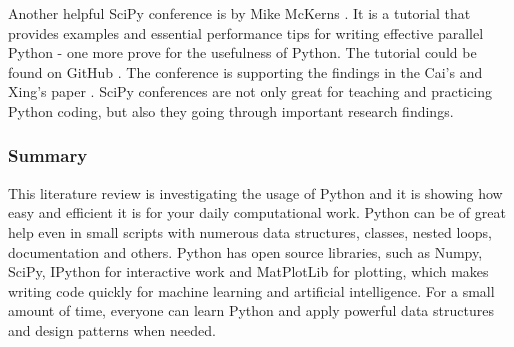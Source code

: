 Another helpful SciPy conference is by Mike McKerns \cite{efficientPython}. It is a tutorial that provides examples and essential performance tips for writing effective parallel Python - one more prove for the usefulness of Python. The tutorial could be found on GitHub \cite{parallel}. The conference is supporting the findings in the Cai's and Xing's paper \cite{cai2005performance}. SciPy conferences are not only great for teaching and practicing Python coding, but also they going through important research findings. \cite{sciPy} 


\subsubsection{Summary}
This literature review is investigating the usage of Python and it is showing how easy and efficient it is for your daily computational work. Python can be of great help even in small scripts with numerous data structures, classes, nested loops, documentation and others. Python has open source libraries, such as Numpy, SciPy, IPython for interactive work and MatPlotLib for plotting, which makes writing code quickly for machine learning and artificial intelligence. For a small amount of time, everyone can learn Python and apply powerful data structures and design patterns when needed.